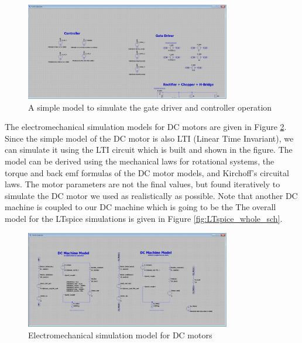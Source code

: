 \begin{figure}[H]
    \centering
    \includegraphics[width=0.8\textwidth]{Figures/Spice_Figures/Schematics/Gate_Driver_Controller_Schematic.PNG}
    \caption{A simple model to simulate the gate driver and controller operation}
    \label{fig:LTspice_driver_controller_sch}
\end{figure}

The electromechanical simulation models for DC motors are given in Figure \ref{fig:LTspice_motor_sch}. Since the simple model of the DC motor is also LTI (Linear Time Invariant), we can simulate it using the LTI circuit which is built and shown in the figure. The model can be derived using the mechanical laws for rotational systems, the torque and back emf formulas of the DC motor models, and Kirchoff's circuital laws. The motor parameters are not the final values, but found iteratively to simulate the DC motor we used as realistically as possible. Note that another DC machine is coupled to our DC machine which is going to be the The overall model for the LTspice simulations is given in Figure \ref{fig:LTspice_whole_sch}.

\begin{figure}[H]
    \centering
    \includegraphics[width=0.8\textwidth]{Figures/Spice_Figures/Schematics/DC_Motor_Models_Schematic.PNG}
    \caption{Electromechanical simulation model for DC motors}
    \label{fig:LTspice_motor_sch}
\end{figure}

